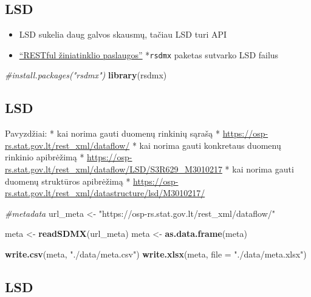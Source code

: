\documentclass[]{article}
\newenvironment{Shaded}{\begin{snugshade}}{\end{snugshade}}
\newcommand{\KeywordTok}[1]{\textcolor[rgb]{0.13,0.29,0.53}{\textbf{#1}}}
\newcommand{\DataTypeTok}[1]{\textcolor[rgb]{0.13,0.29,0.53}{#1}}
\newcommand{\StringTok}[1]{\textcolor[rgb]{0.31,0.60,0.02}{#1}}
\newcommand{\CommentTok}[1]{\textcolor[rgb]{0.56,0.35,0.01}{\textit{#1}}}
\newcommand{\NormalTok}[1]{#1}
\providecommand{\tightlist}{%
  \setlength{\itemsep}{0pt}\setlength{\parskip}{0pt}}
\begin{document}
\subsection{LSD}\label{lsd}

\begin{itemize}
\tightlist
\item
  LSD sukelia daug galvos skausmų, tačiau LSD turi API
\item
  \href{https://osp.stat.gov.lt/rdb-rest}{``RESTful žiniatinklio
  paslaugos''} *\texttt{rsdmx} paketas sutvarko LSD failus
\end{itemize}

\begin{Shaded}
\begin{Highlighting}[]
\CommentTok{#install.packages("rsdmx")}
\KeywordTok{library}\NormalTok{(rsdmx)}
\end{Highlighting}
\end{Shaded}

\subsection{LSD}\label{lsd-1}

Pavyzdžiai: * kai norima gauti duomenų rinkinių sąrašą *
\url{https://osp-rs.stat.gov.lt/rest_xml/dataflow/} * kai norima gauti
konkretaus duomenų rinkinio apibrėžimą *
\url{https://osp-rs.stat.gov.lt/rest_xml/dataflow/LSD/S3R629_M3010217} *
kai norima gauti duomenų struktūros apibrėžimą *
\url{https://osp-rs.stat.gov.lt/rest_xml/datastructure/lsd/M3010217/}

\begin{Shaded}
\begin{Highlighting}[]
\CommentTok{#metadata}
\NormalTok{url_meta <-}\StringTok{ "https://osp-rs.stat.gov.lt/rest_xml/dataflow/"}

\NormalTok{meta <-}\StringTok{ }\KeywordTok{readSDMX}\NormalTok{(url_meta)}
\NormalTok{meta <-}\StringTok{ }\KeywordTok{as.data.frame}\NormalTok{(meta)}

\KeywordTok{write.csv}\NormalTok{(meta, }\StringTok{"./data/meta.csv"}\NormalTok{)}
\KeywordTok{write.xlsx}\NormalTok{(meta, }\DataTypeTok{file =} \StringTok{"./data/meta.xlsx"}\NormalTok{)}
\end{Highlighting}
\end{Shaded}

\subsection{LSD}\label{lsd-2}
\end{document}
